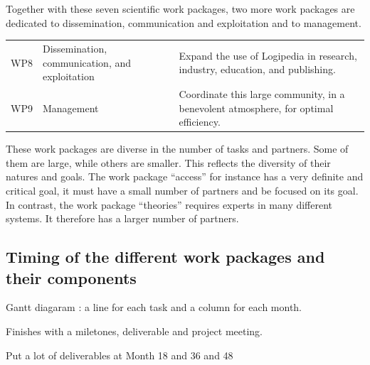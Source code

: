 Together with these seven scientific work packages, 
two more work packages are dedicated to dissemination, communication and
exploitation and to management.

\begin{longtable}{|p{}|p{}|p{}|}
\hline
\rowcolor{color2}\multicolumn{3}{|l|}{\bf Dissemination, communication, exploitation, and management:}\\
\hline
WP8
&
Dissemination, communication, and exploitation
&
Expand the use of Logipedia in research, industry, education, and publishing.
\\
\hline
WP9
&
Management
&
Coordinate this large community, in a benevolent atmosphere, for optimal
efficiency.
\\
\hline
\end{longtable}

These work packages are diverse in the number of tasks and
partners. Some of them are large, while others are smaller. This
reflects the diversity of their natures and goals. The work package
``access'' for instance has a very definite and critical goal, it must
have a small number of partners and be focused on its goal. In
contrast, the work package ``theories'' requires experts in many
different systems.  It therefore has a larger number of partners.

\wpfigstyle{\scriptsize\setlength{\tabcolsep}{2pt}}
\wpfig%

\subsection{Timing of the different work packages and their components}

{\color{red}
Gantt diagaram : a line for each task
and a column for each month.

Finishes with a miletones, deliverable and project meeting.

Put a lot of deliverables at Month 18 and 36 and 48}

\ganttchart[draft,xscale=.32] 


